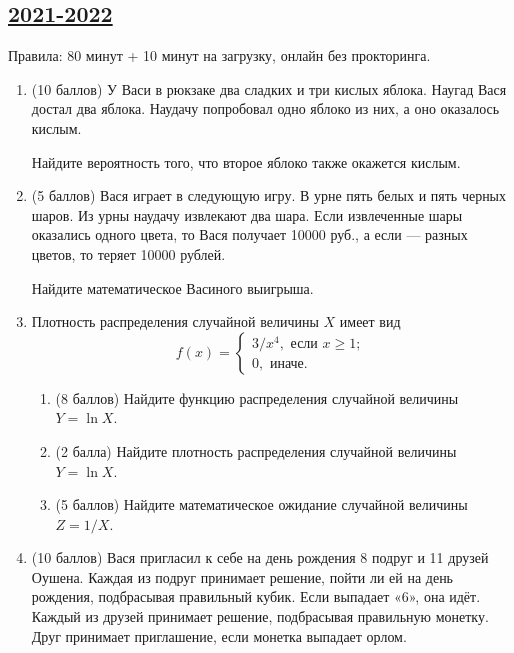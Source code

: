 \subsection[2021-2022]{\hyperref[sec:sol_kr_01_2021_2022]{2021-2022}}
\label{sec:kr_01_2021_2022} %

Правила: 80 минут + 10 минут на загрузку, онлайн без прокторинга.

\begin{enumerate}

  \item (10 баллов) У Васи в рюкзаке два сладких и три кислых яблока. 
      Наугад Вася достал два яблока. Наудачу попробовал одно яблоко из них, а оно оказалось кислым. 
      
      Найдите вероятность того, что второе яблоко также окажется кислым.
  
  \item (5 баллов) Вася играет в следующую игру. В урне пять белых и пять черных шаров. 
  Из урны наудачу извлекают два шара. Если извлеченные шары оказались одного цвета, 
  то Вася получает 10000 руб., а если — разных цветов, то теряет 10000 рублей. 
  
  Найдите математическое Васиного выигрыша. 
  
  \item Плотность распределения случайной величины $X$ имеет вид
  \[
  f(x) = \begin{cases}
  3/x^4, \text{ если } x \geq 1; \\
  0, \text{ иначе.}
  \end{cases}
  \]
  
  \begin{enumerate}
      \item (8 баллов) Найдите функцию распределения случайной величины $Y = \ln X$.
      \item (2 балла) Найдите плотность распределения случайной величины $Y=\ln X$.
      \item (5 баллов) Найдите математическое ожидание случайной величины $Z = 1/X$.
  \end{enumerate}
  
  
  \item (10 баллов) Вася пригласил к себе на день рождения 8 подруг и 11 друзей Оушена.
  Каждая из подруг принимает решение, пойти ли ей на день рождения, подбрасывая правильный кубик. 
  Если выпадает «6», она идёт. Каждый из друзей принимает решение, подбрасывая правильную монетку. 
  Друг принимает приглашение, если монетка выпадает орлом. 
  

\end{enumerate}
